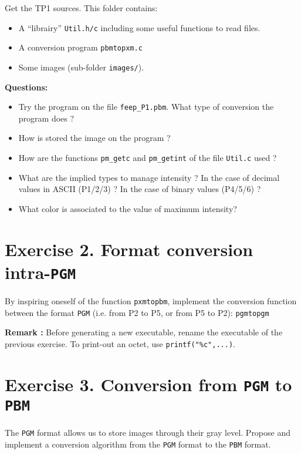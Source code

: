 \documentclass[a4paper, 11pt, english]{article}
\begin{document}
\par Get the TP1 sources. This folder contains:
\begin{itemize}
	\item A ``librairy'' \texttt{Util.h/c} including some useful functions to read files.
	\item A conversion program \texttt{pbmtopxm.c}
	\item Some images (sub-folder \texttt{images/}).
\end{itemize}

\bigskip
\noindent \textbf{Questions:}
\begin{itemize}
	\item Try the program on the file \texttt{feep\_P1.pbm}. What type of conversion the program does ?
	\item How is stored the image on the program ? 
	\item How are the functions \texttt{pm\_getc} and \texttt{pm\_getint} of the file \texttt{Util.c} used ?
	\item What are the implied types to manage intensity ? In the case of decimal values in ASCII (P1/2/3) ? In the case of binary values (P4/5/6) ?
	\item What color is associated to the value of maximum intensity?
\end{itemize}


\section*{\bf Exercise 2. \rm Format conversion intra-\texttt{PGM}}

\par By inspiring oneself of the function \texttt{pxmtopbm}, implement the conversion function between the format \texttt{PGM} (i.e. from P2 to P5, or from P5 to P2): \texttt{pgmtopgm}

\par {\bf Remark :} Before generating a new executable, rename the executable of the previous exercise. To print-out an octet, use \texttt{printf("\%c",...)}.


\section*{\bf Exercise 3. \rm Conversion from \texttt{PGM} to \texttt{PBM}}

\par The {\tt PGM} format allows us to store images through their gray level. Propose and implement a conversion algorithm from the \texttt{PGM} format to the \texttt{PBM} format.
\end{document}
